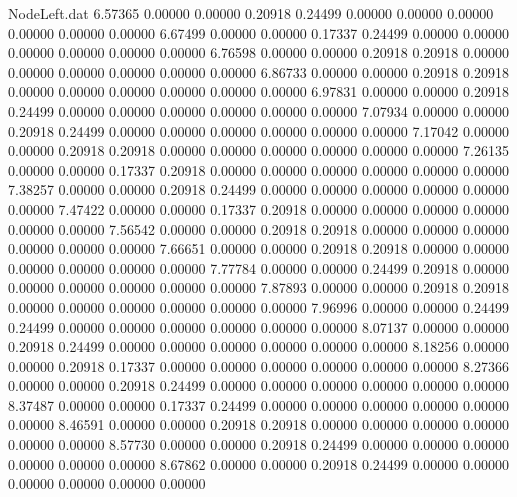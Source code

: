 \begin{filecontents}{NodeLeft.dat}
   6.57365    0.00000    0.00000     0.20918    0.24499    0.00000    0.00000    0.00000    0.00000    0.00000    0.00000
   6.67499    0.00000    0.00000     0.17337    0.24499    0.00000    0.00000    0.00000    0.00000    0.00000    0.00000
   6.76598    0.00000    0.00000     0.20918    0.20918    0.00000    0.00000    0.00000    0.00000    0.00000    0.00000
   6.86733    0.00000    0.00000     0.20918    0.20918    0.00000    0.00000    0.00000    0.00000    0.00000    0.00000
   6.97831    0.00000    0.00000     0.20918    0.24499    0.00000    0.00000    0.00000    0.00000    0.00000    0.00000
   7.07934    0.00000    0.00000     0.20918    0.24499    0.00000    0.00000    0.00000    0.00000    0.00000    0.00000
   7.17042    0.00000    0.00000     0.20918    0.20918    0.00000    0.00000    0.00000    0.00000    0.00000    0.00000
   7.26135    0.00000    0.00000     0.17337    0.20918    0.00000    0.00000    0.00000    0.00000    0.00000    0.00000
   7.38257    0.00000    0.00000     0.20918    0.24499    0.00000    0.00000    0.00000    0.00000    0.00000    0.00000
   7.47422    0.00000    0.00000     0.17337    0.20918    0.00000    0.00000    0.00000    0.00000    0.00000    0.00000
   7.56542    0.00000    0.00000     0.20918    0.20918    0.00000    0.00000    0.00000    0.00000    0.00000    0.00000
   7.66651    0.00000    0.00000     0.20918    0.20918    0.00000    0.00000    0.00000    0.00000    0.00000    0.00000
   7.77784    0.00000    0.00000     0.24499    0.20918    0.00000    0.00000    0.00000    0.00000    0.00000    0.00000
   7.87893    0.00000    0.00000     0.20918    0.20918    0.00000    0.00000    0.00000    0.00000    0.00000    0.00000
   7.96996    0.00000    0.00000     0.24499    0.24499    0.00000    0.00000    0.00000    0.00000    0.00000    0.00000
   8.07137    0.00000    0.00000     0.20918    0.24499    0.00000    0.00000    0.00000    0.00000    0.00000    0.00000
   8.18256    0.00000    0.00000     0.20918    0.17337    0.00000    0.00000    0.00000    0.00000    0.00000    0.00000
   8.27366    0.00000    0.00000     0.20918    0.24499    0.00000    0.00000    0.00000    0.00000    0.00000    0.00000
   8.37487    0.00000    0.00000     0.17337    0.24499    0.00000    0.00000    0.00000    0.00000    0.00000    0.00000
   8.46591    0.00000    0.00000     0.20918    0.20918    0.00000    0.00000    0.00000    0.00000    0.00000    0.00000
   8.57730    0.00000    0.00000     0.20918    0.24499    0.00000    0.00000    0.00000    0.00000    0.00000    0.00000
   8.67862    0.00000    0.00000     0.20918    0.24499    0.00000    0.00000    0.00000    0.00000    0.00000    0.00000

\end{filecontents}
